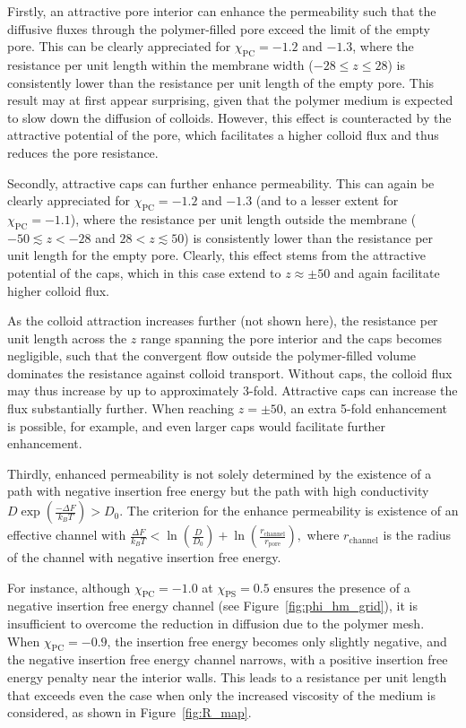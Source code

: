 \documentclass[12pt, a4paper]{article}
\begin{document}
Firstly, an attractive pore interior can enhance the permeability such that the diffusive fluxes through the polymer-filled pore exceed the limit of the empty pore.
This can be clearly appreciated for $\chi_{\textrm{PC}} = -1.2$ and $-1.3$, where the resistance per unit length within the membrane width ($-28 \leq z \leq 28$) is consistently lower than the resistance per unit length of the empty pore.
This result may at first appear surprising, given that the polymer medium is expected to slow down the diffusion of colloids.
However, this effect is counteracted by the attractive potential of the pore, which facilitates a higher colloid flux and thus reduces the pore resistance.

Secondly, attractive caps can further enhance permeability.
This can again be clearly appreciated for $\chi_{\textrm{PC}} = -1.2$ and $-1.3$ (and to a lesser extent for $\chi_{\textrm{PC}} = -1.1$), where the resistance per unit length outside the membrane ($-50 \lesssim z < -28$ and $28 < z \lesssim 50$) is consistently lower than the resistance per unit length for the empty pore. 
Clearly, this effect stems from the attractive potential of the caps, which in this case extend to $z \approx \pm 50$ and again facilitate higher colloid flux. 

As the colloid attraction increases further (not shown here), the resistance per unit length across the $z$ range spanning the pore interior and the caps becomes negligible, such that the convergent flow outside the polymer-filled volume dominates the resistance against colloid transport.
Without caps, the colloid flux may thus increase by up to approximately 3-fold. 
Attractive caps can increase the flux substantially further.
When reaching $z = \pm 50$, an extra 5-fold enhancement is possible, for example, and even larger caps would facilitate further enhancement.

Thirdly, enhanced permeability is not solely determined by the existence of a path with negative insertion free energy but the path with high conductivity $D\exp(\frac{-\Delta F}{k_B T})>D_0$. 
The criterion for the enhance permeability is existence of an effective channel with
$
\frac{\Delta F}{k_B T} < \ln\left( \frac{D}{D_0} \right) + \ln\left( \frac{r_{\textrm{channel}}}{r_{\textrm{pore}}} \right),
$
where $r_{\textrm{channel}}$ is the radius of the channel with negative insertion free energy.

For instance, although $\chi_{\textrm{PC}} = -1.0$ at $\chi_{\textrm{PS}} = 0.5$ ensures the presence of a negative insertion free energy channel (see Figure~\ref{fig:phi_hm_grid}), it is insufficient to overcome the reduction in diffusion due to the polymer mesh. 
When $\chi_{\textrm{PC}} = -0.9$, the insertion free energy becomes only slightly negative, and the negative insertion free energy channel narrows, with a positive insertion free energy penalty near the interior walls. 
This leads to a resistance per unit length that exceeds even the case when only the increased viscosity of the medium is considered, as shown in Figure~\ref{fig:R_map}.
\end{document}
